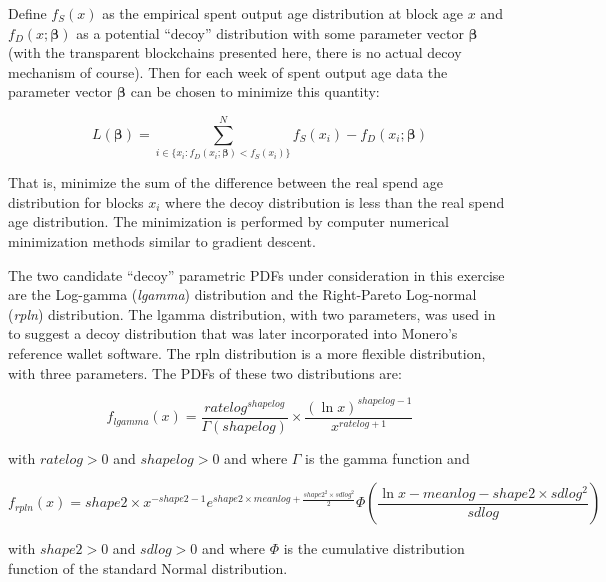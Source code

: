 \documentclass[english]{article}
\begin{document}
Define $f_{S}(x)$ as the empirical spent output age distribution
at block age $x$ and $f_{D}(x;\boldsymbol{\beta})$ as a potential
\textquotedblleft decoy\textquotedblright{} distribution with some
parameter vector $\boldsymbol{\beta}$ (with the transparent blockchains
presented here, there is no actual decoy mechanism of course). Then
for each week of spent output age data the parameter vector $\boldsymbol{\beta}$
can be chosen to minimize this quantity:

\[
L(\boldsymbol{\beta})=\sum_{i\in\{x_{i}:f_{D}(x_{i};\boldsymbol{\beta})<f_{S}(x_{i})\}}^{N}f_{S}(x_{i})-f_{D}(x_{i};\boldsymbol{\beta})
\]

That is, minimize the sum of the difference between the real spend
age distribution for blocks $x_{i}$ where the decoy distribution
is less than the real spend age distribution. The minimization is
performed by computer numerical minimization methods similar to gradient
descent.

The two candidate \textquotedblleft decoy\textquotedblright{} parametric
PDFs under consideration in this exercise are the Log-gamma (\textit{lgamma})
distribution and the Right-Pareto Log-normal (\textit{rpln}) distribution.
The lgamma distribution, with two parameters, was used in \cite{2018}
to suggest a decoy distribution that was later incorporated into Monero's
reference wallet software. The rpln distribution is a more flexible
distribution, with three parameters. The PDFs of these two distributions
are:

\[
f_{lgamma}(x)=\dfrac{ratelog^{shapelog}}{\Gamma(shapelog)}\times\dfrac{(\ln x)^{shapelog-1}}{x^{ratelog+1}}
\]

with $ratelog>0$ and $shapelog>0$ and where $\Gamma$ is the gamma
function and

\[
f_{rpln}(x)=shape2\times x^{-shape2-1}e^{shape2\times meanlog+\frac{shape2^{2}\times sdlog^{2}}{2}}\Phi\left(\frac{\ln x-meanlog-shape2\times sdlog^{2}}{sdlog}\right)
\]

with $shape2>0$ and $sdlog>0$ and where $\Phi$ is the cumulative
distribution function of the standard Normal distribution.
\end{document}

